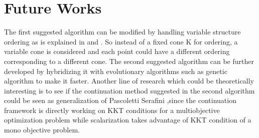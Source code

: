 \documentclass[12pt,a4paper]{article}
\numberwithin{equation}{section}
\begin{document}
\section{Future Works}
The first suggested algorithm can be modified by handling variable structure ordering as is explained in \citep{Eichfelder2014} and \citep{Eichfelder2012}. So instead of a fixed cone K for ordering, a variable cone is considered and each point could have a different ordering corresponding to a different cone.
The second suggested algorithm can be further developed by hybridizing it with evolutionary algorithms such as genetic algorithm to make it faster.
Another line of research which could be theoretically interesting is to see if the continuation method suggested in the second algorithm could be seen as generalization of Pascoletti Serafini ,since the continuation framework is directly working on KKT conditions for a multiobjective optimization problem while scalarization takes advantage of KKT condition of a mono objective problem.


\end{document}
